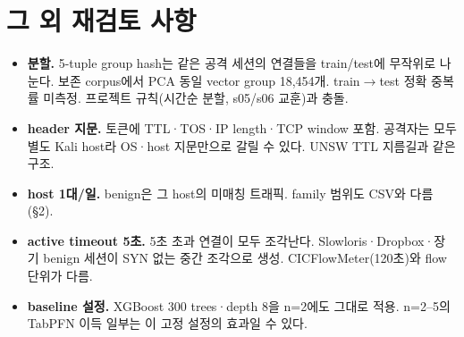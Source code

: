 \section{그 외 재검토 사항}
\begin{itemize}
\item \textbf{분할.} 5-tuple group hash는 같은 공격 세션의 연결들을 train/test에 무작위로 나눈다. 보존 corpus에서 PCA 동일 vector group 18,454개. train$\to$test 정확 중복률 미측정. 프로젝트 규칙(시간순 분할, s05/s06 교훈)과 충돌.
\item \textbf{header 지문.} 토큰에 TTL·TOS·IP length·TCP window 포함. 공격자는 모두 별도 Kali host라 OS·host 지문만으로 갈릴 수 있다. UNSW TTL 지름길과 같은 구조.
\item \textbf{host 1대/일.} benign은 그 host의 미매칭 트래픽. family 범위도 CSV와 다름(\S2).
\item \textbf{active timeout 5초.} 5초 초과 연결이 모두 조각난다. Slowloris·Dropbox·장기 benign 세션이 SYN 없는 중간 조각으로 생성. CICFlowMeter(120초)와 flow 단위가 다름.
\item \textbf{baseline 설정.} XGBoost 300 trees·depth 8을 n=2에도 그대로 적용. n=2--5의 TabPFN 이득 일부는 이 고정 설정의 효과일 수 있다.
\end{itemize}

